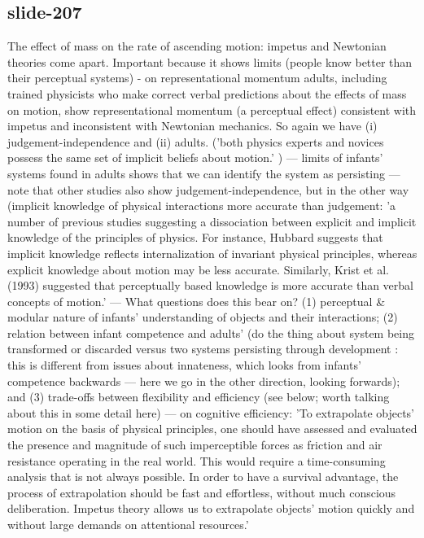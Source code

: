 \documentclass[12pt,\papersize]{extarticle}
\begin{document}
 
\subsection{slide-207}
The effect of mass on the rate of ascending motion: impetus and Newtonian theories come apart.
Important because it shows limits (people know better than their perceptual systems)
- \citep{kozhevnikov:2001_impetus} on representational momentum
adults, including trained physicists who make correct verbal predictions about the effects of mass on motion, show representational momentum (a perceptual effect) consistent with impetus and inconsistent with Newtonian mechanics. So again we have (i) judgement-independence and (ii) adults. ('both physics experts and novices possess the same set of implicit beliefs about motion.' \citep[p.\ 451]{kozhevnikov:2001_impetus})
--- limits of infants' systems found in adults shows that we can identify the system as persisting
--- note that other studies also show judgement-independence, but in the other way (implicit knowledge of physical interactions more accurate than judgement: 'a number of previous studies suggesting a dissociation between explicit and implicit knowledge of the principles of physics. For instance, Hubbard suggests that implicit knowledge reflects internalization of invariant physical principles, whereas explicit knowledge about motion may be less accurate. Similarly, Krist et al. (1993) suggested that perceptually based knowledge is more accurate than verbal concepts of motion.' \citep[p.\ 450]{kozhevnikov:2001_impetus}
--- What questions does this bear on? (1) perceptual \& modular nature of infants' understanding of objects and their interactions; (2) relation between infant competence and adults' (do the thing about system being transformed or discarded versus two systems persisting through development : this is different from issues about innateness, which looks from infants' competence backwards --- here we go in the other direction, looking forwards); and (3) trade-offs between flexibility and efficiency (see below; worth talking about this in some detail here)
--- on cognitive efficiency: 'To extrapolate objects’ motion on the basis of physical principles, one should have assessed and evaluated the presence and magnitude of such imperceptible forces as friction and air resistance operating in the real world. This would require a time-consuming analysis that is not always possible. In order to have a survival advantage, the process of extrapolation should be fast and effortless, without much conscious deliberation. Impetus theory allows us to extrapolate objects’ motion quickly and without large demands on attentional resources.' \citep[p.\ 450]{kozhevnikov:2001_impetus}
\end{document}
